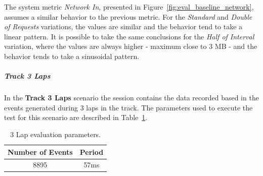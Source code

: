 The system metric \textit{Network In}, presented in Figure~\ref{fig:eval_baseline_network}, assumes a
similar behavior to the previous metric. For the \textit{Standard} and \textit{Double of Requests} variations,
the values are similar and the behavior tend to take a linear pattern. It is possible to take the same
conclusions for the \textit{Half of Interval} variation, where the values are always higher - maximum
close to 3 \gls{MB} - and the behavior tends to take a sinusoidal pattern.

\subparagraph{Track 3 Laps}
\label{subp:eval_exp_data_3laps}
In the \textbf{Track 3 Laps} scenario the session contains the data recorded based in the events generated
during 3 laps in the track. The parameters used to execute the test for this scenario are described in
Table~\ref{tab:3laps_parameters}.\\

\begin{table}[ht!]
  \begin{tabular}{|c|c|}
    \hline
    Number of Events & Period \\ \hline
    8895             & 57ms   \\ \hline
  \end{tabular}
  \caption{3 Lap evaluation parameters.}
  \label{tab:3laps_parameters}
\end{table}


